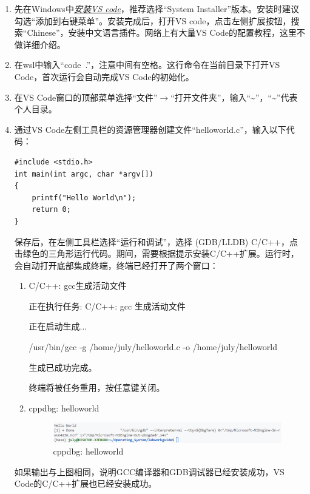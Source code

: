 \documentclass[fontset=ubuntu]{ctexart}
\let\oldhref\href{}
\renewcommand{\href}[2]{\oldhref{#1}{\textit{#2}}}
\begin{document}
\begin{enumerate}
    \item 先在Windows中\href{https://code.visualstudio.com/insiders/}{安装VS code}，推荐选择“System Installer”版本。安装时建议勾选“添加到右键菜单”。安装完成后，打开VS code，点击左侧扩展按钮，搜索“Chinese”，安装中文语言插件。网络上有大量VS Code的配置教程，这里不做详细介绍。
    \item 在wsl中输入“code\ .”，注意中间有空格。这行命令在当前目录下打开VS Code，首次运行会自动完成VS Code的初始化。%
    \item 在VS Code窗口的顶部菜单选择“文件”$\rightarrow$“打开文件夹”，输入“\~{}”，“\~{}”代表个人目录。
    \item 通过VS Code左侧工具栏的资源管理器创建文件“helloworld.c”，输入以下代码：
          \begin{lstlisting}
#include <stdio.h>
int main(int argc, char *argv[])
{
    printf("Hello World\n");
    return 0;
}
          \end{lstlisting}
          保存后，在左侧工具栏选择“运行和调试”，选择 (GDB/LLDB) C/C++，点击绿色的三角形运行代码。期间，需要根据提示安装C/C++扩展。运行时，会自动打开底部集成终端，终端已经打开了两个窗口：
          \begin{enumerate}
              \item C/C++: gcc生成活动文件

                    \textasteriskcentered{}正在执行任务: C/C++: gcc 生成活动文件

                    正在启动生成$\ldots$

                    /usr/bin/gcc -g /home/july/helloworld.c -o /home/july/helloworld

                    生成已成功完成。

                    \textasteriskcentered{}终端将被任务重用，按任意键关闭。
              \item cppdbg: helloworld
                    \begin{figure}[htbp]
                        \centering
                        \includegraphics[width=\textwidth]{./README.assets/cppdbg.png}
                        \caption{cppdbg: helloworld}
                    \end{figure}
          \end{enumerate}
          如果输出与上图相同，说明GCC编译器和GDB调试器已经安装成功，VS Code的C/C++扩展也已经安装成功。
\end{enumerate}
\end{document}

